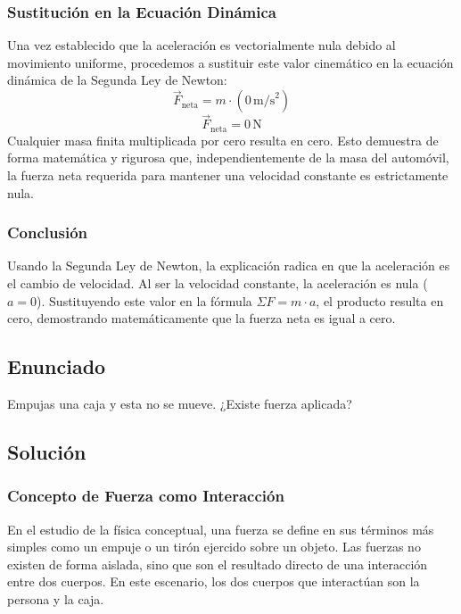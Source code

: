 \documentclass[12pt]{article}
\begin{document}
\subsubsection*{Sustitución en la Ecuación Dinámica}
Una vez establecido que la aceleración es vectorialmente nula debido al movimiento uniforme, procedemos a sustituir este valor cinemático en la ecuación dinámica de la Segunda Ley de Newton:
\begin{equation}
    \vec{F}_{\text{neta}} = m \cdot (0 \, \text{m/s}^2)
\end{equation}
\begin{equation}
    \vec{F}_{\text{neta}} = 0 \, \text{N}
\end{equation}
Cualquier masa finita multiplicada por cero resulta en cero. Esto demuestra de forma matemática y rigurosa que, independientemente de la masa del automóvil, la fuerza neta requerida para mantener una velocidad constante es estrictamente nula.

\subsubsection*{Conclusión}
Usando la Segunda Ley de Newton, la explicación radica en que la aceleración es el cambio de velocidad. Al ser la velocidad constante, la aceleración es nula ($a = 0$). Sustituyendo este valor en la fórmula $\Sigma F = m \cdot a$, el producto resulta en cero, demostrando matemáticamente que la fuerza neta es igual a cero.

\newpage

\subsection*{Enunciado}
Empujas una caja y esta no se mueve. ¿Existe fuerza aplicada?

\subsection*{Solución}

\subsubsection*{Concepto de Fuerza como Interacción}
En el estudio de la física conceptual, una fuerza se define en sus términos más simples como un empuje o un tirón ejercido sobre un objeto. Las fuerzas no existen de forma aislada, sino que son el resultado directo de una interacción entre dos cuerpos. En este escenario, los dos cuerpos que interactúan son la persona y la caja.
\end{document}
